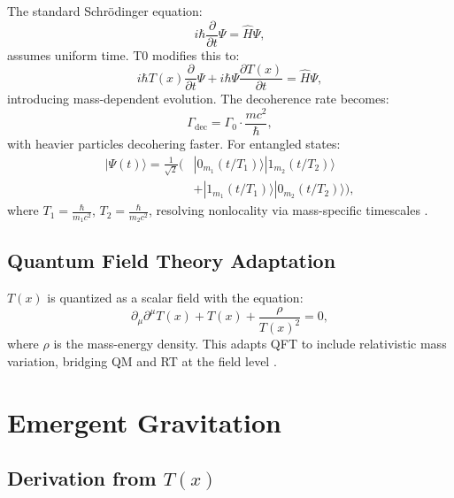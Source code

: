 \documentclass[twocolumn,aps,prl]{revtex4-2}
\newcommand{\Tfield}{T(x)}
\begin{document}
	The standard Schrödinger equation:
	\begin{equation}
		i\hbar \frac{\partial}{\partial t} \Psi = \hat{H} \Psi,
		\label{eq:standard_schrodinger}
	\end{equation}
	assumes uniform time. T0 modifies this to:
	\begin{equation}
		i\hbar \Tfield \frac{\partial}{\partial t} \Psi + i\hbar \Psi \frac{\partial \Tfield}{\partial t} = \hat{H} \Psi,
		\label{eq:modified_schrodinger}
	\end{equation}
	introducing mass-dependent evolution. The decoherence rate becomes:
	\begin{equation}
		\Gamma_{\text{dec}} = \Gamma_0 \cdot \frac{m c^2}{\hbar},
		\label{eq:decoherence}
	\end{equation}
	with heavier particles decohering faster. For entangled states:
	\begin{equation}
		\begin{split}
			|\Psi(t)\rangle = \frac{1}{\sqrt{2}} \Big( &|0_{m_1}(t/T_1)\rangle |1_{m_2}(t/T_2)\rangle \\
			&+ |1_{m_1}(t/T_1)\rangle |0_{m_2}(t/T_2)\rangle \Big),
		\end{split}
		\label{eq:entangled_state}
	\end{equation}
	where \(T_1 = \frac{\hbar}{m_1 c^2}\), \(T_2 = \frac{\hbar}{m_2 c^2}\), resolving nonlocality via mass-specific timescales \cite{pascher_photons_2025}.
	
	\subsection{Quantum Field Theory Adaptation}
	\label{subsec:qft_extension}
	
	\(\Tfield\) is quantized as a scalar field with the equation:
	\begin{equation}
		\partial_{\mu}\partial^{\mu}\Tfield + \Tfield + \frac{\rho}{\Tfield^2} = 0,
		\label{eq:field_eq}
	\end{equation}
	where \(\rho\) is the mass-energy density. This adapts QFT to include relativistic mass variation, bridging QM and RT at the field level \cite{pascher_lagrange_2025}.
	
	\section{Emergent Gravitation}
	\label{sec:emergent_grav}
	
	\subsection{Derivation from \(\Tfield\)}
	\label{subsec:grav_derivation}
	
\end{document}

